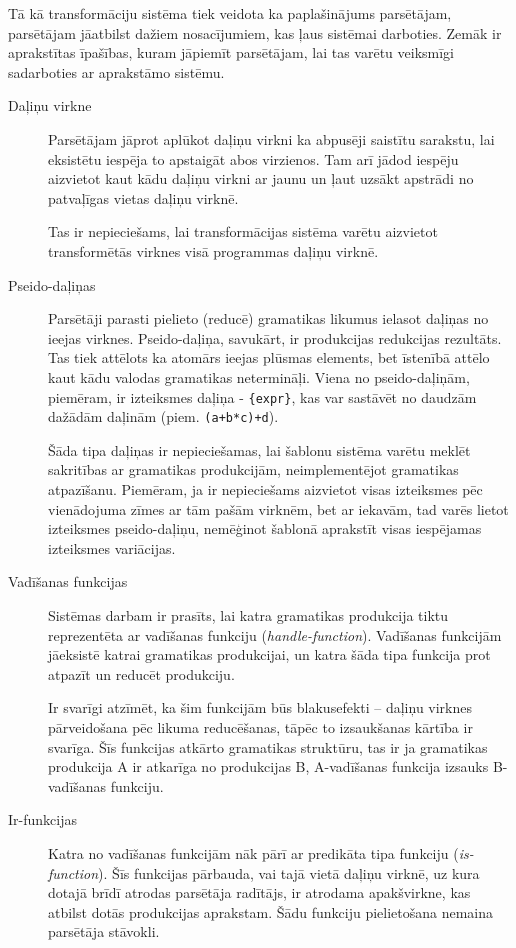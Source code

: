 Tā kā transformāciju sistēma tiek veidota ka paplašinājums parsētājam, parsētājam jāatbilst dažiem nosacījumiem, kas ļaus sistēmai darboties. Zemāk ir aprakstītas īpašības, kuram jāpiemīt parsētājam, lai tas varētu veiksmīgi sadarboties ar aprakstāmo sistēmu.

\begin{description}
\item[Daļiņu virkne]
Parsētājam jāprot aplūkot daļiņu virkni ka abpusēji saistītu sarakstu, lai eksistētu iespēja to apstaigāt abos virzienos. Tam arī jādod iespēju aizvietot kaut kādu daļiņu virkni ar jaunu un ļaut uzsākt apstrādi no patvaļīgas vietas daļiņu virknē.

Tas ir nepieciešams, lai transformācijas sistēma varētu aizvietot transformētās virknes visā programmas daļiņu virknē.

\item[Pseido-daļiņas]
Parsētāji parasti pielieto (reducē) gramatikas likumus ielasot daļiņas no ieejas virknes. Pseido-daļiņa, savukārt, ir produkcijas redukcijas rezultāts. Tas tiek attēlots ka atomārs ieejas plūsmas elements, bet īstenībā attēlo kaut kādu valodas gramatikas netermināļi. Viena no pseido-daļiņām, piemēram, ir izteiksmes daļiņa - \verb|{expr}|, kas var sastāvēt no daudzām dažādām daļinām (piem. \verb|(a+b*c)+d|).

Šāda tipa daļiņas ir nepieciešamas, lai šablonu sistēma varētu meklēt sakritības ar gramatikas produkcijām, neimplementējot gramatikas atpazīšanu. Piemēram, ja ir nepieciešams aizvietot visas izteiksmes pēc vienādojuma zīmes ar tām pašām virknēm, bet ar iekavām, tad varēs lietot izteiksmes pseido-daļiņu, nemēģinot šablonā aprakstīt visas iespējamas izteiksmes variācijas.

\item[Vadīšanas funkcijas]
Sistēmas darbam ir prasīts, lai katra gramatikas produkcija tiktu reprezentēta ar vadīšanas funkciju (\emph{handle-function}). Vadīšanas funkcijām jāeksistē katrai gramatikas produkcijai, un katra šāda tipa funkcija prot atpazīt un reducēt produkciju.

Ir svarīgi atzīmēt, ka šim funkcijām būs blakusefekti -- daļiņu virknes pārveidošana pēc likuma reducēšanas, tāpēc to izsaukšanas kārtība ir svarīga. Šīs funkcijas atkārto gramatikas struktūru, tas ir ja gramatikas produkcija A ir atkarīga no produkcijas B, A-vadīšanas funkcija izsauks B-vadīšanas funkciju.

\item[Ir-funkcijas]
Katra no vadīšanas funkcijām nāk pārī ar predikāta tipa funkciju (\emph{is-function}). Šīs funkcijas pārbauda, vai tajā vietā daļiņu virknē, uz kura dotajā brīdī atrodas parsētāja radītājs, ir atrodama apakšvirkne, kas atbilst dotās produkcijas aprakstam. Šādu funkciju pielietošana nemaina parsētāja stāvokli.


\end{description}
